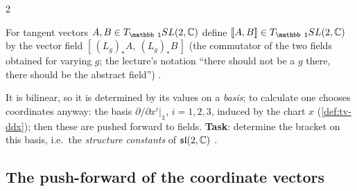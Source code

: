 \begin{paracol}{2}
\begin{definition}\label{def:sl-bracket}
For tangent vectors $A,B\in T_{\mathbb 1}SL(2,\C)$ define $[\![A,B]\!]\in T_{\mathbb 1}SL(2,\C)$ by the vector field $[\,(L_g)_*A,\ (L_g)_*B\,]$ (the commutator of the two fields obtained for varying $g$; the lecture's notation ``there should not be a $g$ there, there should be the abstract field'')       .
\end{definition}
It is bilinear, so it is determined by its values on a \emph{basis}; to calculate one chooses coordinates anyway: the basis $\partial/\partial x^i|_{\mathbb 1}$, $i=1,2,3$, induced by the chart $x$ (\cref{def:tv-ddx}); then these are pushed forward to fields. \textbf{Task}: determine the bracket on this basis, i.e.\ the \emph{structure constants} of $\mathfrak{sl}(2,\mathbb{C})$    .

\subsection{The push-forward of the coordinate vectors}\label{sec:sl-pushforward}


\end{paracol}
